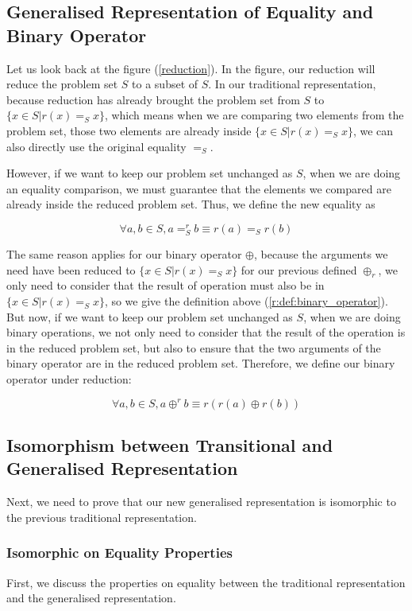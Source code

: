 \documentclass[a4paper,12pt,twoside,openright]{report}
\newcommand{\e}[2]{
\begin{equation}
  \label{#1} 
  #2
\end{equation}
}
\begin{document}
\subsection{Generalised Representation of Equality and Binary Operator}
Let us look back at the figure (\ref{reduction}). In the figure, our reduction will reduce the problem set $S$ to a subset of $S$. In our traditional representation, because reduction has already brought the problem set from $S$ to $\{x \in S | r(x) =_S x\}$, which means when we are comparing two elements from the problem set, those two elements are already inside $\{x \in S | r(x) =_S x\}$, we can also directly use the original equality $=_S$.

However, if we want to keep our problem set unchanged as $S$, when we are doing an equality comparison, we must guarantee that the elements we compared are already inside the reduced problem set. Thus, we define the new equality as
\e{gr:def:eq}{\forall a,b \in S, a =^r_S b \equiv r(a) =_S r(b)}

The same reason applies for our binary operator  $\oplus$, because the arguments we need have been reduced to $\{x \in S | r(x) =_S x \}$ for our previous defined $\oplus_r$, we only need to consider that the result of operation must also be in $\{x \in S | r(x) =_S x\}$, so we give the definition above (\ref{r:def:binary_operator}).
But now, if we want to keep our problem set unchanged as $S$, when we are doing binary operations, we not only need to consider that the result of the operation is in the reduced problem set, but also to ensure that the two arguments of the binary operator are in the reduced problem set. Therefore, we define our binary operator under reduction:
\e{gr:def:binary_operator}{\forall a,b \in S, a \oplus^r b \equiv r(r(a) \oplus r(b))}

\subsection{Isomorphism between Transitional and Generalised Representation}
Next, we need to prove that our new generalised representation is isomorphic to the previous traditional representation.

\subsubsection{Isomorphic on Equality Properties}
First, we discuss the properties on equality between the traditional representation and the generalised representation.
\end{document}
